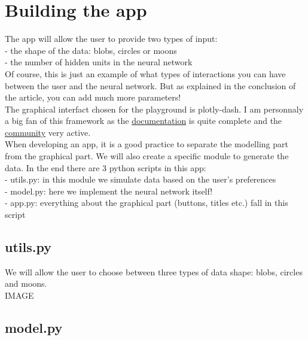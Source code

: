 \section{Building the app}

The app will allow the user to provide two types of input: \\

- the shape of the data: blobs, circles or moons \\

- the number of hidden units in the neural network \\

Of course, this is just an example of what types of interactions you can have between the user and the neural network. But as explained in the conclusion of the article, you can add much more parameters! \\

The graphical interfact chosen for the playground is plotly-dash. I am personnaly a big fan of this framework as the \href{https://dash.plotly.com/}{documentation} is quite complete and the \href{https://community.plotly.com/c/dash/16}{community} very active. \\

When developing an app, it is a good practice to separate the modelling part from the graphical part. We will also create a specific module to generate the data. In the end there are 3 python scripts in this app: \\

- utils.py: in this module we simulate data based on the user's preferences \\

- model.py: here we implement the neural network itself! \\

- app.py: everything about the graphical part (buttons, titles etc.) fall in this script \\

\subsection{utils.py}

We will allow the user to choose between three types of data shape: blobs, circles and moons. \\

IMAGE  \\

\subsection{model.py}

